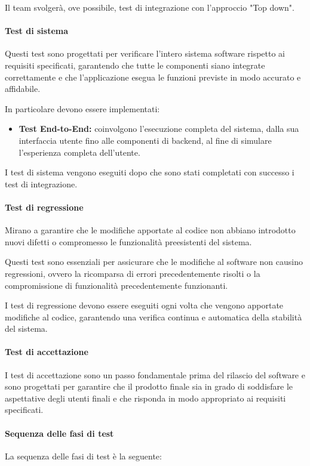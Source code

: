 Il team svolgerà, ove possibile, test di integrazione con l'approccio "Top down".

\paragraph{Test di sistema}
Questi test sono progettati per verificare l'intero sistema software rispetto ai requisiti specificati, garantendo che tutte le componenti siano integrate correttamente e che l'applicazione esegua le funzioni previste in modo accurato e affidabile.

In particolare devono essere implementati:
\begin{itemize}
    \item  \textbf{Test End-to-End:} 
        coinvolgono l'esecuzione completa del sistema, dalla sua interfaccia utente fino alle componenti di backend, al fine di simulare l'esperienza completa dell'utente.
\end{itemize}

I test di sistema vengono eseguiti dopo che sono stati completati con successo i test di integrazione.

\paragraph{Test di regressione}
Mirano a garantire che le modifiche apportate al codice non abbiano introdotto nuovi difetti o compromesso le funzionalità preesistenti del sistema.

Questi test sono essenziali per assicurare che le modifiche al software non causino regressioni, ovvero la ricomparsa di errori precedentemente risolti o la compromissione di funzionalità precedentemente funzionanti.

I test di regressione devono essere eseguiti ogni volta che vengono apportate modifiche al codice, garantendo una verifica continua e automatica della stabilità del sistema.

\paragraph{Test di accettazione}
I test di accettazione sono un passo fondamentale prima del rilascio del software e sono progettati per garantire che il prodotto finale sia in grado di soddisfare le aspettative degli utenti finali e che risponda in modo appropriato ai requisiti specificati.

\paragraph{Sequenza delle fasi di test}
La sequenza delle fasi di test è la seguente:

